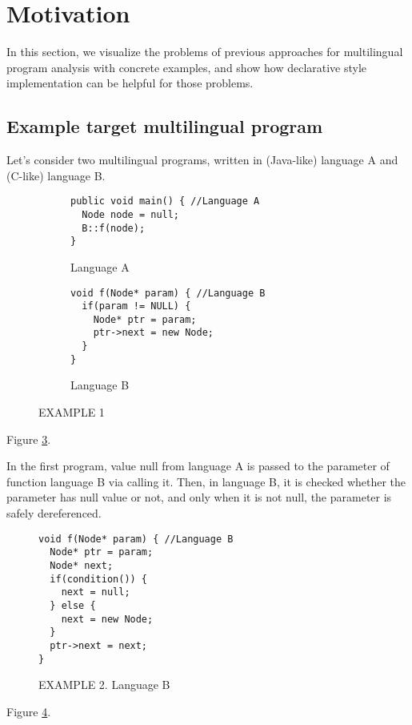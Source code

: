 \section{Motivation}

In this section, we visualize the problems of previous approaches for
multilingual program analysis with concrete examples, and show how declarative
style implementation can be helpful for those problems.

\subsection{Example target multilingual program}

Let's consider two multilingual programs, written in (Java-like) language A
and (C-like) language B.
\begin{figure}[t]
  \centering
  \vspace{2mm}
  \begin{subfigure}[t]{0.5\textwidth}
    \begin{lstlisting}[style=java,xleftmargin=2.5em]
public void main() { //Language A
  Node node = null;
  B::f(node);
}
    \end{lstlisting}
    \vspace*{-.5em}
    \caption{Language A}
    \label{fig:exam1:langA}
  \end{subfigure}
  \begin{subfigure}[t]{0.5\textwidth}
    \begin{lstlisting}[style=cpp,firstnumber=5,xleftmargin=2.5em]
void f(Node* param) { //Language B
  if(param != NULL) {
    Node* ptr = param;
    ptr->next = new Node;
  }
}
    \end{lstlisting}
    \vspace*{-.5em}
    \caption{Language B}
    \label{fig:exam1:langB}
  \end{subfigure}
  \vspace*{-.5em}
  \caption{EXAMPLE 1}
  \label{fig:exam1}
\end{figure}
Figure \ref{fig:exam1}.

In the first program, value null from language A is passed to the parameter of
function language B via calling it. Then, in language B, it is checked whether
the parameter has null value or not, and only when it is not null, the
parameter is safely dereferenced.

\begin{figure}[t]
  \centering
  \vspace{2mm}
  \begin{lstlisting}[style=cpp,firstnumber=5,xleftmargin=2.5em]
void f(Node* param) { //Language B
  Node* ptr = param;
  Node* next;
  if(condition()) {
    next = null;
  } else {
    next = new Node;
  }
  ptr->next = next;
}
  \end{lstlisting}
  \vspace*{-.5em}
  \caption{EXAMPLE 2. Language B}
  \label{fig:exam2}
\end{figure}
Figure \ref{fig:exam2}.

